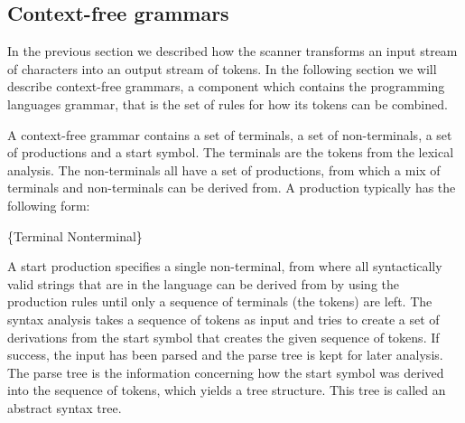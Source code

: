 \subsection{Context-free grammars}
\label{sec:context-freegrammars}

In the previous section we described how the scanner transforms an input stream
of characters into an output stream of tokens. In the following section we will
describe context-free grammars, a component which contains the programming
languages grammar, that is the set of rules for how its tokens can be combined.

A context-free grammar contains a set of terminals, a set of non-terminals, a
set of productions and a start symbol. The terminals are the tokens from the
lexical analysis. The non-terminals all have a set of productions, from which a
mix of terminals and non-terminals can be derived from. A production typically
has the following form:

\begin{ebnf}
 {\{Terminal \gor \gcat Nonterminal\}}
\end{ebnf}

A start production specifies a single non-terminal, from where all syntactically
valid strings that are in the language can be derived from by using the
production rules until only a sequence of terminals (the tokens) are left.  The
syntax analysis takes a sequence of tokens as input and tries to create a set of
derivations from the start symbol that creates the given sequence of tokens. If
success, the input has been parsed and the parse tree is kept for later
analysis. The parse tree is the information concerning how the start symbol was
derived into the sequence of tokens, which yields a tree structure.  This tree
is called an abstract syntax tree.

